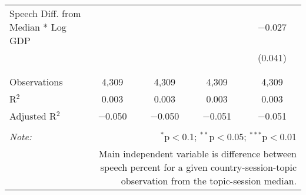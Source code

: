 \begin{table}[!htbp]
\begin{tabular}{@{\extracolsep{5pt}}lcccc}
 Speech Diff. from Median * Log GDP &  &  &  & $-$0.027 \\ 
  &  &  &  & (0.041) \\ 
  & & & & \\ 
\hline \\[-1.8ex] 
Observations & 4,309 & 4,309 & 4,309 & 4,309 \\ 
R$^{2}$ & 0.003 & 0.003 & 0.003 & 0.003 \\ 
Adjusted R$^{2}$ & $-$0.050 & $-$0.050 & $-$0.051 & $-$0.051 \\ 
\hline 
\hline \\[-1.8ex] 
\textit{Note:}  & \multicolumn{4}{r}{$^{*}$p$<$0.1; $^{**}$p$<$0.05; $^{***}$p$<$0.01} \\ 
 & \multicolumn{4}{r}{Main independent variable is difference between speech percent for a given country-session-topic observation from the topic-session median.} \\ 
\end{tabular} 
\end{table} 
